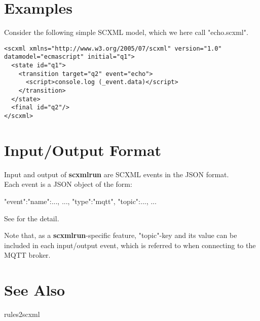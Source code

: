 \documentclass[fancy]{article}
\begin{document}
\section{Examples}
Consider the following simple SCXML model, which we here call "echo.scxml".

\begin{verbatim}
<scxml xmlns="http://www.w3.org/2005/07/scxml" version="1.0" datamodel="ecmascript" initial="q1">
  <state id="q1">
    <transition target="q2" event="echo">
      <script>console.log (_event.data)</script>
    </transition>
  </state>
  <final id="q2"/>
</scxml>
\end{verbatim}


\section{Input/Output Format}

Input and output of \textbf{scxmlrun} are SCXML events in the JSON format.\\
Each event is a JSON object of the form:
\begin{center}
\LBr"event":\LBr"name":..., ...\RBr, "type":"mqtt", "topic":..., ...\RBr
\end{center}

See  for the detail.

Note that, as a \textbf{scxmlrun}-specific feature,
"topic"-key and its value can be included in each input/output event,
which is referred to when connecting to the MQTT broker.

\section{See Also}
rules2scxml
\end{document}
